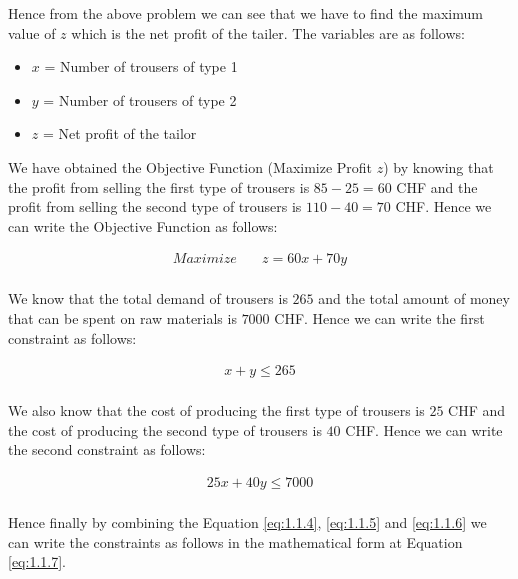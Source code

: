 \documentclass[unicode,11pt,a4paper,oneside,numbers=endperiod,openany]{scrartcl}
\begin{document}
Hence from the above problem we can see that we have to find the maximum value of $z$ which is the net profit of the tailer. The variables are as follows:


\begin{itemize}
	\item $x$ = Number of trousers of type 1
	\item $y$ = Number of trousers of type 2
	\item $z$ = Net profit of the tailor
\end{itemize}

We have obtained the Objective Function (Maximize Profit $z$) by knowing that the profit from selling the first type of trousers is $85 - 25 = 60$ CHF and the profit from selling the second type of trousers is $110 - 40 = 70$ CHF. Hence we can write the Objective Function as follows:

\begin{equation}
	\begin{aligned}
		Maximize \quad & z = 60x + 70y \\
	\end{aligned}
	\label{eq:1.1.4}
\end{equation}

We know that the total demand of trousers is $265$ and the total amount of money that can be spent on raw materials is $7000$ CHF. Hence we can write the first constraint as follows:

\begin{equation}
	\begin{aligned}
		x + y \leq 265 \\
	\end{aligned}
	\label{eq:1.1.5}
\end{equation}

We also know that the cost of producing the first type of trousers is $25$ CHF and the cost of producing the second type of trousers is $40$ CHF. Hence we can write the second constraint as follows:

\begin{equation}
	\begin{aligned}
		25x + 40y \leq 7000 \\
	\end{aligned}
	\label{eq:1.1.6}
\end{equation}

Hence finally by combining the Equation \ref{eq:1.1.4}, \ref{eq:1.1.5} and \ref{eq:1.1.6} we can write the constraints as follows in the mathematical form at Equation \ref{eq:1.1.7}.
\end{document}
